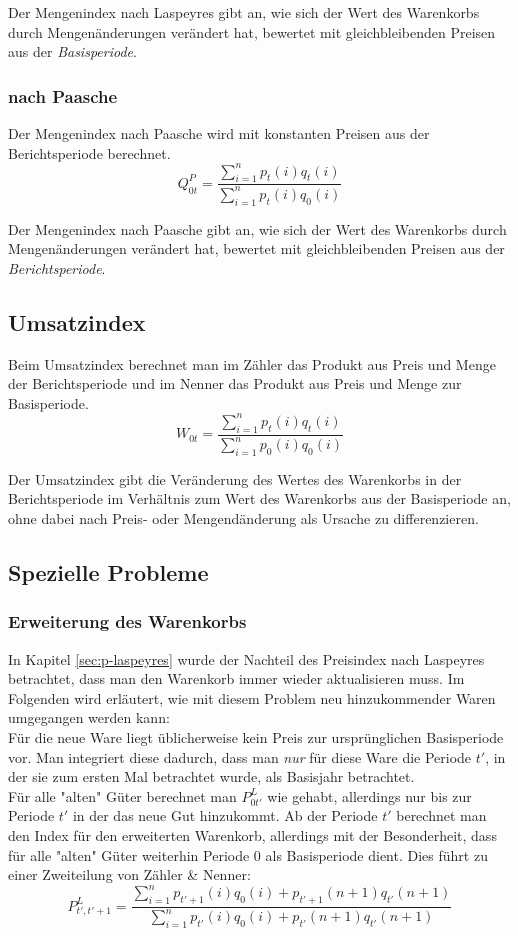 \documentclass[a4paper]{article}
\begin{document}
\noindent Der Mengenindex nach Laspeyres gibt an, wie sich der Wert des Warenkorbs durch Mengenänderungen verändert hat, bewertet mit gleichbleibenden Preisen aus der \textit{Basisperiode}.

\subsubsection{nach Paasche}\label{sec:q-paasche}
Der Mengenindex nach Paasche wird mit konstanten Preisen aus der Berichtsperiode berechnet.
$$ Q_{0t}^P = \frac{\sum_{i=1}^n p_t(i)q_t(i)}{\sum_{i=1}^n p_t(i)q_0(i)}$$

\noindent Der Mengenindex nach Paasche gibt an, wie sich der Wert des Warenkorbs durch Mengenänderungen verändert hat, bewertet mit gleichbleibenden Preisen aus der \textit{Berichtsperiode}.

\subsection{Umsatzindex}
Beim Umsatzindex berechnet man im Zähler das Produkt aus Preis und Menge der Berichtsperiode und im Nenner das Produkt aus Preis und Menge zur Basisperiode.
$$W_{0t} = \frac{\sum_{i=1}^n p_t(i)q_t(i)}{\sum_{i=1}^n p_0(i)q_0(i)}$$

\noindent Der Umsatzindex gibt die Veränderung des Wertes des Warenkorbs in der Berichtsperiode im Verhältnis zum Wert des Warenkorbs aus der Basisperiode an, ohne dabei nach Preis- oder Mengendänderung als Ursache zu differenzieren.


\subsection{Spezielle Probleme}
\subsubsection{Erweiterung des Warenkorbs}
In Kapitel \ref{sec:p-laspeyres} wurde der Nachteil des Preisindex nach Laspeyres betrachtet, dass man den Warenkorb immer wieder aktualisieren muss. Im Folgenden wird erläutert, wie mit diesem Problem neu hinzukommender Waren umgegangen werden kann:\\
Für die neue Ware liegt üblicherweise kein Preis zur ursprünglichen Basisperiode vor. Man integriert diese dadurch, dass man \textit{nur} für diese Ware die Periode $t'$, in der sie zum ersten Mal betrachtet wurde, als Basisjahr betrachtet.\\ 
Für alle "alten" Güter berechnet man $P_{0t'}^L$ wie gehabt, allerdings nur bis zur Periode $t'$ in der das neue Gut hinzukommt. Ab der Periode $t'$ berechnet man den Index für den erweiterten Warenkorb, allerdings mit der Besonderheit, dass für alle "alten" Güter weiterhin Periode 0 als Basisperiode dient. Dies führt zu einer Zweiteilung von Zähler \& Nenner:
$$P_{t',t'+1}^L =\frac{\sum_{i=1}^n p_{t'+1}(i)q_0(i) + p_{t'+1}(n+1)q_{t'}(n+1)}{\sum_{i=1}^n p_{t'}(i)q_0(i) + p_{t'}(n+1)q_{t'}(n+1)}$$
\end{document}
